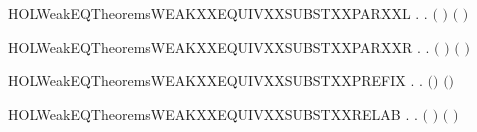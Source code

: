 \newcommand{\HOLWeakEQTheoremsWEAKXXEQUIVXXrules}{\UseVerbatim{HOLWeakEQTheoremsWEAKXXEQUIVXXrules}}
\begin{SaveVerbatim}{HOLWeakEQTheoremsWEAKXXEQUIVXXSUBSTXXPARXXL}
\HOLTokenTurnstile{} \HOLSymConst{\HOLTokenForall{}} .
          \HOLSymConst{\HOLTokenImp{}} \HOLSymConst{\HOLTokenForall{}}.  \ensuremath{(} \HOLSymConst{\ensuremath{\mid}} \ensuremath{)} \ensuremath{(} \HOLSymConst{\ensuremath{\mid}} \ensuremath{)}
\end{SaveVerbatim}
\newcommand{\HOLWeakEQTheoremsWEAKXXEQUIVXXSUBSTXXPARXXL}{\UseVerbatim{HOLWeakEQTheoremsWEAKXXEQUIVXXSUBSTXXPARXXL}}
\begin{SaveVerbatim}{HOLWeakEQTheoremsWEAKXXEQUIVXXSUBSTXXPARXXR}
\HOLTokenTurnstile{} \HOLSymConst{\HOLTokenForall{}} .
          \HOLSymConst{\HOLTokenImp{}} \HOLSymConst{\HOLTokenForall{}}.  \ensuremath{(} \HOLSymConst{\ensuremath{\mid}} \ensuremath{)} \ensuremath{(} \HOLSymConst{\ensuremath{\mid}} \ensuremath{)}
\end{SaveVerbatim}
\newcommand{\HOLWeakEQTheoremsWEAKXXEQUIVXXSUBSTXXPARXXR}{\UseVerbatim{HOLWeakEQTheoremsWEAKXXEQUIVXXSUBSTXXPARXXR}}
\begin{SaveVerbatim}{HOLWeakEQTheoremsWEAKXXEQUIVXXSUBSTXXPREFIX}
\HOLTokenTurnstile{} \HOLSymConst{\HOLTokenForall{}} .    \HOLSymConst{\HOLTokenImp{}} \HOLSymConst{\HOLTokenForall{}}.  \ensuremath{(}\HOLSymConst{\ensuremath{\ldotp}}\ensuremath{)} \ensuremath{(}\HOLSymConst{\ensuremath{\ldotp}}\ensuremath{)}
\end{SaveVerbatim}
\newcommand{\HOLWeakEQTheoremsWEAKXXEQUIVXXSUBSTXXPREFIX}{\UseVerbatim{HOLWeakEQTheoremsWEAKXXEQUIVXXSUBSTXXPREFIX}}
\begin{SaveVerbatim}{HOLWeakEQTheoremsWEAKXXEQUIVXXSUBSTXXRELAB}
\HOLTokenTurnstile{} \HOLSymConst{\HOLTokenForall{}} .
          \HOLSymConst{\HOLTokenImp{}}
       \HOLSymConst{\HOLTokenForall{}}.  \ensuremath{(}  \ensuremath{)} \ensuremath{(}  \ensuremath{)}
\end{SaveVerbatim}
